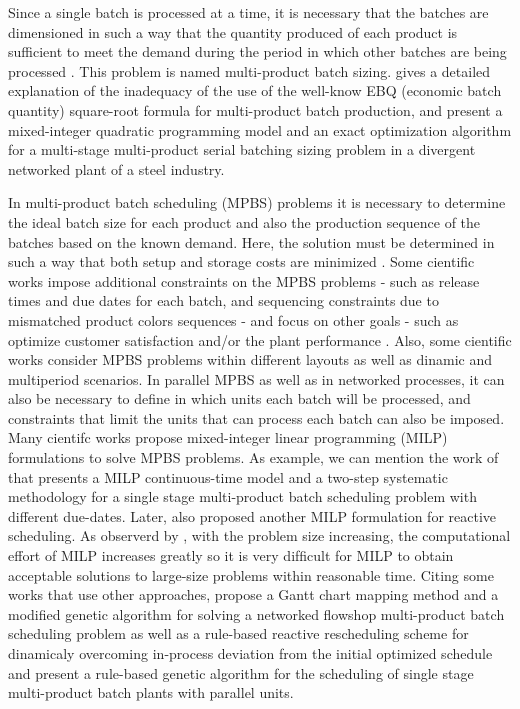 \documentclass[10pt,fleqn,a4paper,twoside]{article}
\begin{document}
Since a single batch is processed at a time, it is necessary that the batches are dimensioned in such a way that the quantity produced of each product is sufficient to meet the demand during the period in which other batches are being processed \citep{Eilon1985}. This problem is named multi-product batch sizing. \cite{Eilon1985} gives a detailed explanation of the inadequacy of the use of the well-know EBQ (economic batch quantity) square-root formula for multi-product batch production, and \cite{LiuEtAl2020} present a mixed-integer quadratic programming model and an exact optimization algorithm for a multi-stage multi-product serial batching sizing problem in a divergent networked plant of a steel industry.

In multi-product batch scheduling (MPBS) problems it is necessary to determine the ideal batch size for each product and also the production sequence of the batches based on the known demand. Here, the solution must be determined in such a way that both setup and storage costs are minimized \citep{Eilon1985, Omega1993, LiuEtAl2020}. Some cientific works impose additional constraints on the MPBS problems - such as release times and due dates for each batch, and sequencing constraints due to mismatched product colors sequences - and focus on other goals - such as optimize customer satisfaction and/or the plant performance \citep{MendezEtAll2000, ShiEtAll2017}. Also, some cientific works consider MPBS problems within different layouts as well as dinamic and multiperiod scenarios. In parallel MPBS as well as in networked processes, it can also be necessary to define in which units each batch will be processed, and constraints that limit the units that can process each batch can also be imposed. Many cientifc works propose mixed-integer linear programming (MILP) formulations to solve MPBS problems. As example, we can mention the work of \cite{MendezEtAll2000} that presents a MILP continuous-time model and a two-step systematic methodology for a single stage multi-product batch scheduling problem with different due-dates. Later, \cite{MendezCerda2003} also proposed another MILP formulation for reactive scheduling. As observerd by \cite{HeHui2008}, with the problem size increasing, the computational effort of MILP increases greatly so it is very difﬁcult for MILP to obtain acceptable solutions to large-size problems within reasonable time. Citing some works that use other approaches, \cite {KimEtAl1996} propose a Gantt chart mapping method and a modified genetic algorithm for solving a networked flowshop multi-product batch scheduling problem as well as a rule-based reactive rescheduling scheme for dinamicaly overcoming in-process deviation from the initial optimized schedule and \cite{HeHui2008} present a rule-based genetic algorithm for the scheduling of single stage multi-product batch plants with parallel units.
\end{document}
